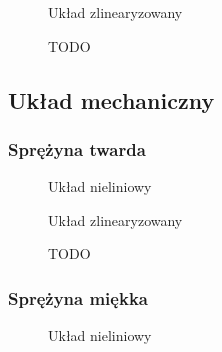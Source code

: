 \documentclass[a4paper, 10pt]{article}
\begin{document}
				
				\begin{figure}[H]
					\centering
					\def \svgwidth{0.75\columnwidth}
					
					\caption{Układ zlinearyzowany}
				\end{figure}\noindent
				
				
				\begin{figure}[H]
					\centering
					\def \svgwidth{0.75\columnwidth}
					
					\caption{TODO}
				\end{figure}\noindent
			
		\subsection{Układ mechaniczny}
			\subsubsection{Sprężyna twarda}
				\begin{figure}[H]
					\centering
					\def \svgwidth{0.75\columnwidth}
					
					\caption{Układ nieliniowy}
				\end{figure}\noindent
				
				
				\begin{figure}[H]
					\centering
					\def \svgwidth{0.75\columnwidth}
					
					\caption{Układ zlinearyzowany}
				\end{figure}\noindent
				
				
				\begin{figure}[H]
					\centering
					\def \svgwidth{0.75\columnwidth}
					
				\end{figure}\noindent
				
				
				\begin{figure}[H]
					\centering
					\def \svgwidth{0.75\columnwidth}
					
					\caption{TODO}
				\end{figure}\noindent
				
			\subsubsection{Sprężyna miękka}
				\begin{figure}[H]
					\centering
					\def \svgwidth{0.75\columnwidth}
					
					\caption{Układ nieliniowy}
				\end{figure}\noindent
				
\end{document}
